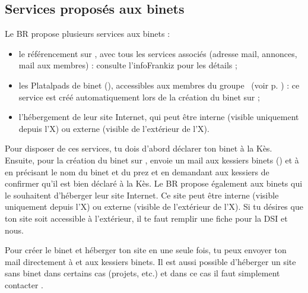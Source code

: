 \subsection{Services proposés aux binets}

Le BR propose plusieurs services aux binets :
\begin{itemize}
\item le référencement sur \fkz, avec tous les services associés (adresse mail, annonces, mail aux membres) : consulte l'infoFrankiz pour les détails ;
\item les Platalpads de binet (), accessibles aux membres du groupe \fkz\ (voir p. \pageref{platalpad}) : ce service est créé automatiquement lors de la création du binet sur \fkz ;
\item l'hébergement de leur site Internet, qui peut être interne (visible uniquement depuis l'X) ou externe (visible de l'extérieur de l'X).\\
\end{itemize}

Pour disposer de ces services, tu dois d'abord déclarer ton binet à la Kès. Ensuite, pour la création du binet sur \fkz,
envoie un mail aux kessiers binets () et à  en précisant le nom du binet et du prez et en demandant aux kessiers de confirmer qu'il est bien déclaré à la Kès.
\vspace{4mm}
Le BR propose également aux binets qui le souhaitent d'héberger leur site Internet. Ce site peut être interne (visible uniquement depuis l'X) ou externe (visible de l'extérieur de l'X). Si tu désires que ton site soit accessible à l'extérieur, il te faut remplir une fiche pour la DSI et nous.

Pour créer le binet et héberger ton site en une seule fois, tu peux envoyer ton mail directement à  et aux kessiers binets.
Il est aussi possible d'héberger un site sans binet dans certains cas (projets, etc.) et dans ce cas il faut simplement contacter .

